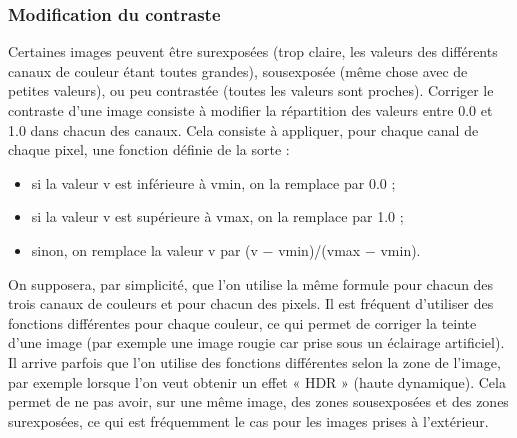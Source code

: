 \documentclass[letterpaper,10pt,english]{jupyterBook}
\begin{document}
\subsubsection{Modification du contraste}
\label{\detokenize{notebooks/images/TRAITEMENT-DES-IMAGES:modification-du-contraste}}
\sphinxAtStartPar
Certaines images peuvent être surexposées (trop claire, les valeurs des différents canaux de couleur étant toutes grandes), sous\sphinxhyphen{}exposée (même chose avec de petites valeurs), ou peu contrastée (toutes les valeurs sont proches).
Corriger le contraste d’une image consiste à modifier la répartition des valeurs entre 0.0 et 1.0 dans chacun des canaux. Cela consiste à appliquer, pour chaque canal de chaque pixel, une fonction définie de la sorte :
\begin{itemize}
\item {} 
\sphinxAtStartPar
si la valeur v est inférieure à vmin, on la remplace par 0.0 ;

\item {} 
\sphinxAtStartPar
si la valeur v est supérieure à vmax, on la remplace par 1.0 ;

\item {} 
\sphinxAtStartPar
sinon, on remplace la valeur v par (v − vmin)/(vmax − vmin).

\end{itemize}

\sphinxAtStartPar
On supposera, par simplicité, que l’on utilise la même formule pour chacun des trois canaux de couleurs et pour chacun des pixels. Il est fréquent d’utiliser des fonctions différentes pour chaque couleur, ce qui permet de corriger la teinte d’une image (par exemple une image rougie car prise sous un éclairage artificiel). Il arrive parfois que l’on utilise des fonctions différentes selon la zone de l’image, par exemple lorsque l’on veut obtenir un effet « HDR » (haute dynamique). Cela permet de ne pas avoir, sur une même image, des zones sous\sphinxhyphen{}exposées et des zones sur\sphinxhyphen{}exposées, ce qui est fréquemment le cas pour les images prises à l’extérieur.
\end{document}
